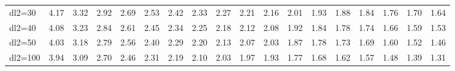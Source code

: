 \documentclass[
  11pt,
  french,
]{book}
\begin{document}
\begin{table}
\begin{tabular}[t]{lrrrrrrrrrrrrrrrrr}
dl2=30 & 4.17 & 3.32 & 2.92 & 2.69 & 2.53 & 2.42 & 2.33 & 2.27 & 2.21 & 2.16 & 2.01 & 1.93 & 1.88 & 1.84 & 1.76 & 1.70 & 1.64\\
\addlinespace
dl2=40 & 4.08 & 3.23 & 2.84 & 2.61 & 2.45 & 2.34 & 2.25 & 2.18 & 2.12 & 2.08 & 1.92 & 1.84 & 1.78 & 1.74 & 1.66 & 1.59 & 1.53\\
dl2=50 & 4.03 & 3.18 & 2.79 & 2.56 & 2.40 & 2.29 & 2.20 & 2.13 & 2.07 & 2.03 & 1.87 & 1.78 & 1.73 & 1.69 & 1.60 & 1.52 & 1.46\\
dl2=100 & 3.94 & 3.09 & 2.70 & 2.46 & 2.31 & 2.19 & 2.10 & 2.03 & 1.97 & 1.93 & 1.77 & 1.68 & 1.62 & 1.57 & 1.48 & 1.39 & 1.31\\
\bottomrule
\end{tabular}
\end{table}

  

\printindex
\end{document}
